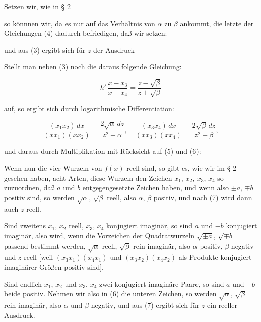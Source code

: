 
Setzen wir, wie in § 2


so könnnen wir, da es nur auf das Verhältnis von $\alpha$ zu $\beta$ ankommt, die letzte der Gleichungen (4) dadurch befriedigen, daß wir setzen: %


und aus (3) ergibt sich für $z$ der Ausdruck


Stellt man neben (3) noch die daraus folgende Gleichung:

\[
h'\,\dfrac{x-x_3}{x-x_4} = \dfrac{z-\sqrt{\beta}}{z+\sqrt{\beta}}
\]

auf, so ergibt sich durch logarithmische Differentiation:

\[
\dfrac{(x_1x_2)\,dx}{(xx_1)(xx_2)} = \dfrac{2\sqrt{\alpha}\,dz}{z^2-\alpha}, \quad \dfrac{(x_3x_4)\,dx}{(xx_3)(xx_4)} = \dfrac{2\sqrt{\beta}\,dz}{z^2-\beta},
\]

und daraus durch Multiplikation mit Rücksicht auf (5) und (6):


Wenn nun die vier Wurzeln von $f(x)$ reell sind, so gibt es, wie wir im § 2 gesehen haben, acht Arten, diese Wurzeln den Zeichen $x_1$, $x_2$, $x_3$, $x_4$ so zuzuordnen, daß $a$ und $b$ entgegengesetzte Zeichen haben, und wenn also $\pm a$, $\mp b$ positiv sind, so werden $\sqrt{\alpha}$, $\sqrt{\beta}$ reell, also $\alpha$, $\beta$ positiv, und nach (7) wird dann auch $z$ reell.

Sind zweitens $x_1$, $x_2$ reell, $x_3$, $x_4$ konjugiert imaginär, so sind $a$ und $-b$ konjugiert imaginär, also wird, wenn die Vorzeichen der Quadratwurzeln $\sqrt{\pm a}$, $\sqrt{\mp b}$ passend bestimmt werden, $\sqrt{\alpha}$ reell, $\sqrt{\beta}$ rein imaginär, also $\alpha$ positiv, $\beta$ negativ und $z$ reell [weil $(x_3x_1)(x_4x_1)$ und $(x_3x_2)(x_4x_2)$ als Produkte konjugiert imaginärer Größen positiv sind].

Sind endlich $x_1$, $x_2$ und $x_3$, $x_4$ zwei konjugiert imaginäre Paare, so sind $a$ und $-b$ beide positiv. Nehmen wir also in (6) die unteren Zeichen, so werden $\sqrt{\alpha}$, $\sqrt{\beta}$ rein imaginär, also $\alpha$ und $\beta$ negativ, und aus (7) ergibt sich für $z$ ein reeller Ausdruck.
